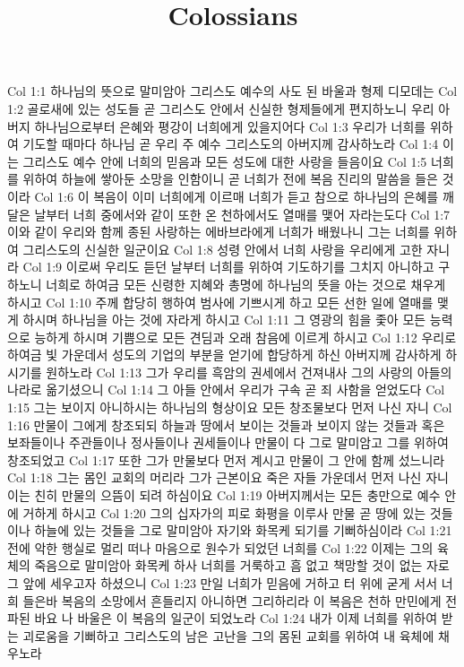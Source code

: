 

\title{Colossians}

Col 1:1  하나님의 뜻으로 말미암아 그리스도 예수의 사도 된 바울과 형제 디모데는
Col 1:2  골로새에 있는 성도들 곧 그리스도 안에서 신실한 형제들에게 편지하노니 우리 아버지 하나님으로부터 은혜와 평강이 너희에게 있을지어다
Col 1:3  우리가 너희를 위하여 기도할 때마다 하나님 곧 우리 주 예수 그리스도의 아버지께 감사하노라
Col 1:4  이는 그리스도 예수 안에 너희의 믿음과 모든 성도에 대한 사랑을 들음이요
Col 1:5  너희를 위하여 하늘에 쌓아둔 소망을 인함이니 곧 너희가 전에 복음 진리의 말씀을 들은 것이라
Col 1:6  이 복음이 이미 너희에게 이르매 너희가 듣고 참으로 하나님의 은혜를 깨달은 날부터 너희 중에서와 같이 또한 온 천하에서도 열매를 맺어 자라는도다
Col 1:7  이와 같이 우리와 함께 종된 사랑하는 에바브라에게 너희가 배웠나니 그는 너희를 위하여 그리스도의 신실한 일군이요
Col 1:8  성령 안에서 너희 사랑을 우리에게 고한 자니라
Col 1:9  이로써 우리도 듣던 날부터 너희를 위하여 기도하기를 그치지 아니하고 구하노니 너희로 하여금 모든 신령한 지혜와 총명에 하나님의 뜻을 아는 것으로 채우게 하시고
Col 1:10  주께 합당히 행하여 범사에 기쁘시게 하고 모든 선한 일에 열매를 맺게 하시며 하나님을 아는 것에 자라게 하시고
Col 1:11  그 영광의 힘을 좇아 모든 능력으로 능하게 하시며 기쁨으로 모든 견딤과 오래 참음에 이르게 하시고
Col 1:12  우리로 하여금 빛 가운데서 성도의 기업의 부분을 얻기에 합당하게 하신 아버지께 감사하게 하시기를 원하노라
Col 1:13  그가 우리를 흑암의 권세에서 건져내사 그의 사랑의 아들의 나라로 옮기셨으니
Col 1:14  그 아들 안에서 우리가 구속 곧 죄 사함을 얻었도다
Col 1:15  그는 보이지 아니하시는 하나님의 형상이요 모든 창조물보다 먼저 나신 자니
Col 1:16  만물이 그에게 창조되되 하늘과 땅에서 보이는 것들과 보이지 않는 것들과 혹은 보좌들이나 주관들이나 정사들이나 권세들이나 만물이 다 그로 말미암고 그를 위하여 창조되었고
Col 1:17  또한 그가 만물보다 먼저 계시고 만물이 그 안에 함께 섰느니라
Col 1:18  그는 몸인 교회의 머리라 그가 근본이요 죽은 자들 가운데서 먼저 나신 자니 이는 친히 만물의 으뜸이 되려 하심이요
Col 1:19  아버지께서는 모든 충만으로 예수 안에 거하게 하시고
Col 1:20  그의 십자가의 피로 화평을 이루사 만물 곧 땅에 있는 것들이나 하늘에 있는 것들을 그로 말미암아 자기와 화목케 되기를 기뻐하심이라
Col 1:21  전에 악한 행실로 멀리 떠나 마음으로 원수가 되었던 너희를
Col 1:22  이제는 그의 육체의 죽음으로 말미암아 화목케 하사 너희를 거룩하고 흠 없고 책망할 것이 없는 자로 그 앞에 세우고자 하셨으니
Col 1:23  만일 너희가 믿음에 거하고 터 위에 굳게 서서 너희 들은바 복음의 소망에서 흔들리지 아니하면 그리하리라 이 복음은 천하 만민에게 전파된 바요 나 바울은 이 복음의 일군이 되었노라
Col 1:24  내가 이제 너희를 위하여 받는 괴로움을 기뻐하고 그리스도의 남은 고난을 그의 몸된 교회를 위하여 내 육체에 채우노라
